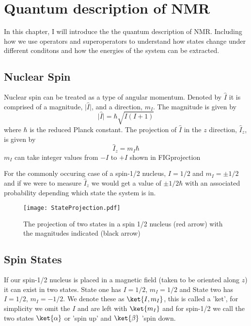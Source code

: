 
\section{Quantum description of NMR}

In this chapter, I will introduce the the quantum description of NMR. Including how
we use operators and superoperators to understand how states change under different conditons and how the energies of the system can be extracted.

\subsection{Nuclear Spin}

Nuclear spin can be treated as a type of angular momentum. Denoted by $\hat{I}$
it is comprised of a magnitude, $\lvert\hat{I}\rvert$, and a direction, $m_I$.
The magnitude is given by
\begin{equation}
  \lvert\hat{I}\rvert = \hbar\sqrt{I(I+1)}
\end{equation}
where $\hbar$ is the reduced Planck constant. The projection of $\hat{I}$ in
the $z$ direction, $\hat{I}_{z}$, is given by
\begin{equation}
  \hat{I}_{z} = m_I\hbar
\end{equation}
$m_{I}$ can take integer values from $-I$ to $+I$ shown in FIGprojection

For the commonly occuring case of a spin-1/2 nucleus, $I=1/2$ and $m_I = ±1/2$ and if we were to measure $\hat{I}_z$ we would get a value of $±1/2\hbar$ with an associated probability depending which state the system is in.

\begin{figure}
  \begin{center}
  \texttt{[image: StateProjection.pdf]}
  \end{center}
  \caption{The projection of two states in a spin 1/2 nucleus (red arrow) with the magnitudes indicated (black arrow)}
  \label{fig:Projection}
\end{figure}

\subsection{Spin States}

If our spin-1/2 nucleus is placed in a magnetic field (taken to be oriented along $z$) it can exist in two states.
State one has $I = 1/2$, $m_I = 1/2$ and State two has $I = 1/2$, $m_I = -1/2$. We denote these as $\ket{I,m_I}$, this is called a 'ket', for simplicity we omit the $I$ and are left with
$\ket{m_I}$ and for spin-1/2 we call the two states $\ket{\alpha}$ or 'spin up' and $\ket{\beta}$ 'spin down.

